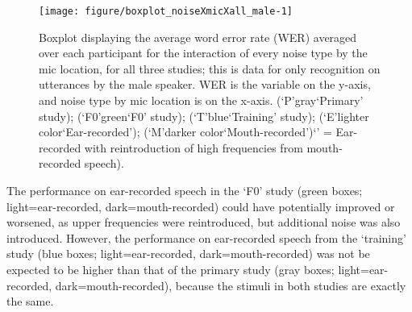 \begin{figure}[h!]
\DIFaddbeginFL \centering
\textbf{}
\DIFaddendFL 

\texttt{[image: figure/boxplot\_noiseXmicXall\_male-1]} 

\caption{Boxplot displaying the average word error rate (WER) averaged over each participant for the interaction of every noise type by the mic location, for all three studies; this is data for only recognition on utterances by the male speaker. WER is the variable on the y-axis, and noise type by mic location is on the x-axis. (`P'\DIFdelbeginFL \DIFdelFL{,}\DIFdelendFL \DIFaddbeginFL \DIFaddFL{=}\DIFaddendFL gray\DIFdelbeginFL \DIFdelFL{,}\DIFdelendFL \DIFaddbeginFL \DIFaddFL{=}\DIFaddendFL `Primary' study); (`F0'\DIFdelbeginFL \DIFdelFL{,}\DIFdelendFL \DIFaddbeginFL \DIFaddFL{=}\DIFaddendFL green\DIFdelbeginFL \DIFdelFL{,}\DIFdelendFL \DIFaddbeginFL \DIFaddFL{=}\DIFaddendFL `F0' study); (`T'\DIFdelbeginFL \DIFdelFL{,}\DIFdelendFL \DIFaddbeginFL \DIFaddFL{=}\DIFaddendFL blue\DIFdelbeginFL \DIFdelFL{,}\DIFdelendFL \DIFaddbeginFL \DIFaddFL{=}\DIFaddendFL `Training' study); (`E'\DIFdelbeginFL \DIFdelFL{,}\DIFdelendFL \DIFaddbeginFL \DIFaddFL{=}\DIFaddendFL lighter color\DIFdelbeginFL \DIFdelFL{,}\DIFdelendFL \DIFaddbeginFL \DIFaddFL{=}\DIFaddendFL `Ear-recorded'); (`M'\DIFdelbeginFL \DIFdelFL{,}\DIFdelendFL \DIFaddbeginFL \DIFaddFL{=}\DIFaddendFL darker color\DIFdelbeginFL \DIFdelFL{,}\DIFdelendFL \DIFaddbeginFL \DIFaddFL{=}\DIFaddendFL `Mouth-recorded')\DIFdelbeginFL {}\DIFdelendFL \DIFaddbeginFL \DIFaddFL{; (}\DIFaddendFL `\DIFdelbeginFL {}\DIFdelendFL \DIFaddbeginFL {}\DIFaddendFL ' = Ear-recorded \DIFaddbeginFL {}\DIFaddendFL with reintroduction of high frequencies \DIFdelbeginFL \DIFdelFL{(}\DIFdelendFL from mouth-recorded speech).}
\label{fig:male-all}
\end{figure}


The performance on ear-recorded speech in the `F0' study (green boxes; light=ear-recorded, dark=mouth-recorded) could have potentially improved or worsened, as upper frequencies were reintroduced, but additional noise was also introduced.  However, the performance on ear-recorded speech from the `training' study (blue boxes; light=ear-recorded, dark=mouth-recorded) was not be expected to be higher than that of the primary study (gray boxes; light=ear-recorded, dark=mouth-recorded), because the stimuli in both studies are exactly the same.  

